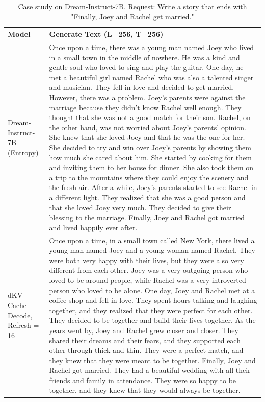 \documentclass{article}
\newcommand{\dmethodname}{dKV-Cache-Decode}
\begin{document}
\begin{table}[t]
    \centering
    \caption{Case study on Dream-Instruct-7B. Request: Write a story that ends with "Finally, Joey and Rachel get married."} \label{tbl:case_study_dream_free}
    \begin{tabular}{p{2cm}|p{11cm}}
    \toprule
    Model & Generate Text (L=256, T=256)\\
    \midrule
    Dream-Instruct-7B (Entropy) & Once upon a time, there was a young man named Joey who lived in a small town in the middle of nowhere. He was a kind and gentle soul who loved to sing and play the guitar. One day, he met a beautiful girl named Rachel who was also a talented singer and musician. They fell in love and decided to get married. However, there was a problem. Joey's parents were against the marriage because they didn't know Rachel well enough. They thought that she was not a good match for their son. Rachel, on the other hand, was not worried about Joey's parents' opinion. She knew that she loved Joey and that he was the one for her. She decided to try and win over Joey's parents by showing them how much she cared about him. She started by cooking for them and inviting them to her house for dinner. She also took them on a trip to the mountains where they could enjoy the scenery and the fresh air. After a while, Joey's parents started to see Rachel in a different light. They realized that she was a good person and that she loved Joey very much. They decided to give their blessing to the marriage. Finally, Joey and Rachel got married and lived happily ever after. \\
    \midrule
    \dmethodname, Refresh = 16 & Once upon a time, in a small town called New York, there lived a young man named Joey and a young woman named Rachel. They were both very happy with their lives, but they were also very different from each other. Joey was a very outgoing person who loved to be around people, while Rachel was a very introverted person who loved to be alone. 
One day, Joey and Rachel met at a coffee shop and fell in love. They spent hours talking and laughing together, and they realized that they were perfect for each other. They decided to be together and build their lives together. 
As the years went by, Joey and Rachel grew closer and closer. They shared their dreams and their fears, and they supported each other through thick and thin. They were a perfect match, and they knew that they were meant to be together. 
Finally, Joey and Rachel got married. They had a beautiful wedding with all their friends and family in attendance. They were so happy to be together, and they knew that they would always be together. \\

\end{tabular}
\end{table}
\end{document}
